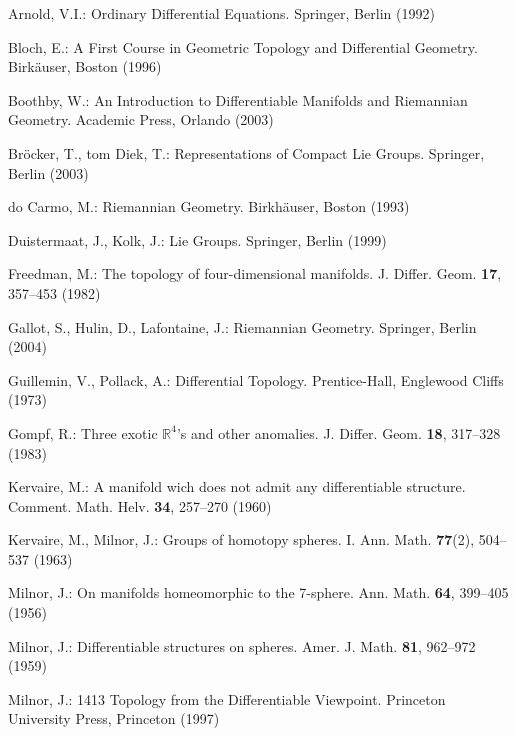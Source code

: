 \RGReferenceSection

\begin{description}[style=multiline,leftmargin=5em,labelwidth=4.5em,font=\normalfont]
\item[{[Arn92]}]Arnold, V.I.: Ordinary Differential Equations. Springer, Berlin (1992)
\item[{[Blo96]}]Bloch, E.: A First Course in Geometric Topology and Differential Geometry. Birkäuser, Boston (1996)
\item[{[Boo03]}]Boothby, W.: An Introduction to Differentiable Manifolds and Riemannian Geometry. Academic Press, Orlando (2003)
\item[{[BtD03]}]Bröcker, T., tom Diek, T.: Representations of Compact Lie Groups. Springer, Berlin (2003)
\item[{[dC93]}]do Carmo, M.: Riemannian Geometry. Birkhäuser, Boston (1993)
\item[{[DK99]}]Duistermaat, J., Kolk, J.: Lie Groups. Springer, Berlin (1999)
\item[{[Fre82]}]Freedman, M.: The topology of four-dimensional manifolds. J. Differ. Geom. \textbf{17}, 357–453 (1982)
\item[{[GHL04]}]Gallot, S., Hulin, D., Lafontaine, J.: Riemannian Geometry. Springer, Berlin (2004)
\item[{[GP73]}]Guillemin, V., Pollack, A.: Differential Topology. Prentice-Hall, Englewood Cliffs (1973)
\item[{[Gom83]}]Gompf, R.: Three exotic $\mathbb{R}^4$'s and other anomalies. J. Differ. Geom. \textbf{18}, 317–328 (1983)
\item[{[Ker60]}]Kervaire, M.: A manifold wich does not admit any differentiable structure. Comment. Math. Helv. \textbf{34}, 257–270 (1960)
\item[{[KM63]}]Kervaire, M., Milnor, J.: Groups of homotopy spheres. I. Ann. Math. \textbf{77}(2), 504–537 (1963)
\item[{[Mil56]}]Milnor, J.: On manifolds homeomorphic to the 7-sphere. Ann. Math. \textbf{64}, 399–405 (1956)
\item[{[Mil59]}]Milnor, J.: Differentiable structures on spheres. Amer. J. Math. \textbf{81}, 962–972 (1959)
\item[{[Mil97]}]Milnor, J.: 1413 Topology from the Differentiable Viewpoint. Princeton University Press, Princeton (1997)

\end{description}
